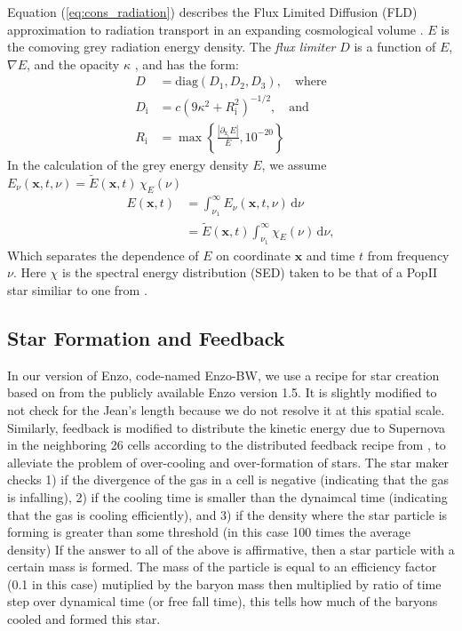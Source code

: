 \documentclass[letterpaper,10pt]{article}
\renewcommand{\(}{\left(}
\renewcommand{\)}{\right)}
\begin{document}
Equation (\ref{eq:cons_radiation}) describes the Flux Limited
Diffusion (FLD) approximation to radiation transport in an expanding
cosmological volume \citep{HayesNorman2003, Paschos2005}.  $E$ is the
comoving grey radiation energy density.  The {\em flux limiter} $D$ is
a function of $E$, $\nabla E$, and the opacity $\kappa$
\citep{Morel2000}, and has the form:
\begin{align}
  D &= \mbox{diag}\left(D_1, D_2, D_3\right), \quad\mbox{where} \\
  D_\mathrm{i} &= c \(9\kappa^2 + R_\mathrm{i}^2\)^{-1/2},\quad\mbox{and} \\
  R_\mathrm{i} &= \max\left\{\frac{|\partial_\mathrm{x_i} E|}{E},10^{-20}\right\}
\end{align}
In the calculation of the grey energy density $E$, we assume
$E_\nu(\mathbf{x},t,\nu)=\tilde{E}(\mathbf{x},t)\,\chi_E(\nu)$ 
\begin{align}
\label{eq:grey_definition}
  E(\mathbf{x},t) &= \int_{\nu_1}^{\infty} E_\nu(\mathbf{x},t,\nu)\,\mathrm d\nu \nonumber \\
  &=\tilde{E}(\mathbf{x},t) \int_{\nu_1}^{\infty} \chi_E(\nu)\,\mathrm d\nu,
\end{align}
Which separates the dependence of $E$ on coordinate $\mathbf{x}$ and
time $t$ from frequency $\nu$. Here $\chi$ is the spectral energy
distribution (SED) taken to be that of a Pop{\footnotesize II} star
similiar to one from \citep{RicottiEtAl2002}. 


\subsection{Star Formation and Feedback}
\label{StarFormationandFeedback}

In our version of Enzo, code-named Enzo-BW, we use a recipe for star
creation based on \citealt{Cen1992} from the publicly available Enzo version 1.5.
It is slightly modified to not check for the Jean's length because we 
do not resolve it at this spatial scale.  Similarly, feedback is
modified to distribute the kinetic energy due to Supernova in the
neighboring 26 cells according to the distributed feedback recipe from
\citealt{SmithHallmanShullOShea2011}, to alleviate the problem of
over-cooling and over-formation of stars.  The star maker checks 1)
if the divergence of the gas in a cell is negative (indicating that
the gas is infalling), 2) if the cooling time is smaller than the
dynaimcal time (indicating that the gas is cooling efficiently), and
3) if the density where the star particle is forming is greater than some 
threshold (in this case 100 times the average density)
If the answer to all of the above is affirmative, then a star
particle with a certain mass is formed.  The mass of the particle is equal 
to an efficiency factor (0.1 in this case) mutiplied by the baryon mass then 
multiplied by ratio of time step over dynamical time (or free fall time), this 
tells how much of the baryons cooled and formed this star. 
\end{document}
